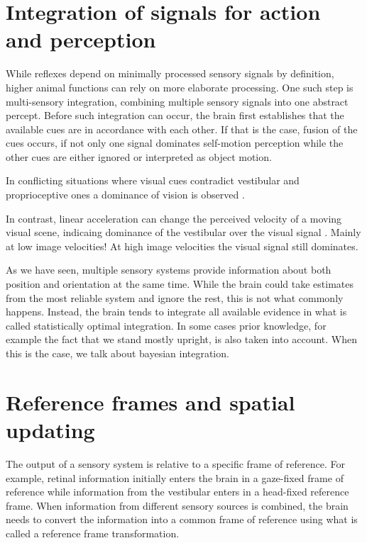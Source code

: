 

\section{Integration of signals for action and perception}
While reflexes depend on minimally processed sensory signals by definition, higher animal functions can rely on more elaborate processing. One such step is multi-sensory integration, combining multiple sensory signals into one abstract percept. Before such integration can occur, the brain first establishes that the available cues are in accordance with each other. If that is the case, fusion of the cues occurs, if not only one signal dominates self-motion perception while the other cues are either ignored or interpreted as object motion.

In conflicting situations where visual cues contradict vestibular and proprioceptive ones a dominance of vision is observed \cite{berthoz1975}.

In contrast, linear acceleration can change the perceived velocity of a moving visual scene, indicaing dominance of the vestibular over the visual signal \cite{pavard1977}. Mainly at low image velocities! At high image velocities the visual signal still dominates.

As we have seen, multiple sensory systems provide information about both position and orientation at the same time. While the brain could take estimates from the most reliable system and ignore the rest, this is not what commonly happens.
Instead, the brain tends to integrate all available evidence in what is called statistically optimal integration. In some cases prior knowledge, for example the fact that we stand mostly upright, is also taken into account. When this is the case, we talk about bayesian integration.


\section{Reference frames and spatial updating}
The output of a sensory system is relative to a specific frame of reference. For example, retinal information initially enters the brain in a gaze-fixed frame of reference while information from the vestibular enters in a head-fixed reference frame. When information from different sensory sources is combined, the brain needs to convert the information into a common frame of reference using what is called a reference frame transformation.

